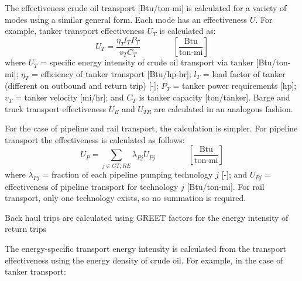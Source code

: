 \documentclass[11pt]{report}
\newcommand{\eqnunitfrac}[2]{\quad\quad \scriptstyle{\left[\frac{\text{#1}}{\text{#2}}\right]}}
\begin{document}
The effectiveness crude oil transport [Btu/ton-mi] is calculated for a variety of modes using a similar general form. Each mode has an effectiveness $U$. For example, tanker transport effectiveness $U_{T}$ is calculated as:
\begin{equation}\label{eq:trans_ek}
U_T = \frac{\eta_T l_T P_T}{v_T C_T} \quad\quad\eqnunitfrac{Btu}{ton-mi}
\end{equation}
where $U_T$ = specific energy intensity of crude oil transport via tanker [Btu/ton-mi]; $\eta_T$ = efficiency of tanker transport [Btu/hp-hr]; $l_T$ = load factor of tanker (different on outbound and return trip) [-]; $P_T$ = tanker power requirements [hp]; $v_T$ = tanker velocity [mi/hr]; and $C_T$ is tanker capacity [ton/tanker]. Barge and truck transport effectiveness $U_{B}$ and $U_{TR}$ are calculated in an analogous fashion.

For the case of pipeline and rail transport, the calculation is simpler. For pipeline transport the effectiveness is calculated as follows: 
\begin{equation}\label{eq:trans_ep}
U_P = \sum_{j \in GT, RE} \lambda_{Pj} U_{Pj} \quad\quad\eqnunitfrac{Btu}{ton-mi}
\end{equation}
where $\lambda_{Pj}$ = fraction of each pipeline pumping technology $j$ [-]; and $U_{Pj}$ = effectiveness of pipeline transport for technology $j$ [Btu/ton-mi]. For rail transport, only one technology exists, so no summation is required.

Back haul trips are calculated using GREET factors for the energy intensity of return trips \cite{Wang2010}

The energy-specific transport energy intensity is calculated from the transport effectiveness using the energy density of crude oil. For example, in the case of tanker transport:
\end{document}
